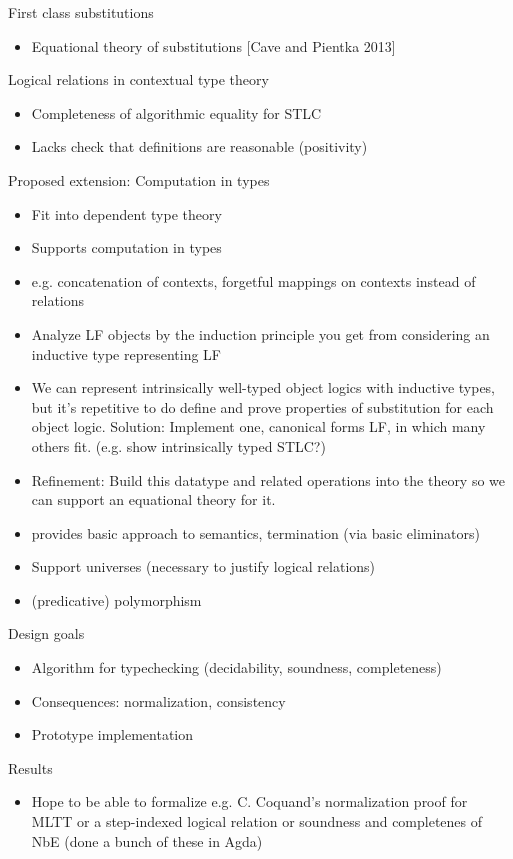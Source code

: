 \documentclass[usenames,dvipsnames]{beamer}
\begin{document}
\begin{frame}{First class substitutions}
\begin{itemize}
\item Equational theory of substitutions
[Cave and Pientka 2013]
\end{itemize}
\end{frame}

\begin{frame}{Logical relations in contextual type theory}
\begin{itemize}
\item Completeness of algorithmic equality for STLC
\item Lacks check that definitions are reasonable (positivity)
\end{itemize}
\end{frame}

\begin{frame}{Proposed extension: Computation in types}
\begin{itemize}
\item Fit into dependent type theory
\item Supports computation in types
\item e.g. concatenation of contexts, forgetful mappings on contexts instead of relations
\item Analyze LF objects by the induction principle you get from considering an inductive type representing LF
\item We can represent intrinsically well-typed object logics with inductive types, but it's repetitive to do define and prove properties of substitution for each object logic. Solution: Implement one, canonical forms LF, in which many others fit. (e.g. show intrinsically typed STLC?)
\item Refinement: Build this datatype and related operations into the theory so we can support an equational theory for it.
\item provides basic approach to semantics, termination (via basic eliminators)
\item Support universes (necessary to justify logical relations)
\item (predicative) polymorphism
\end{itemize}
\end{frame}

\begin{frame}{Design goals}
\begin{itemize}
\item Algorithm for typechecking (decidability, soundness, completeness)
\item Consequences: normalization, consistency
\item Prototype implementation
\end{itemize}
\end{frame}

\begin{frame}{Results}
\begin{itemize}
\item Hope to be able to formalize e.g. C. Coquand's normalization proof for MLTT or a step-indexed logical relation or soundness and completenes of NbE (done a bunch of these in Agda)
\end{itemize}
\end{frame}
\end{document}
